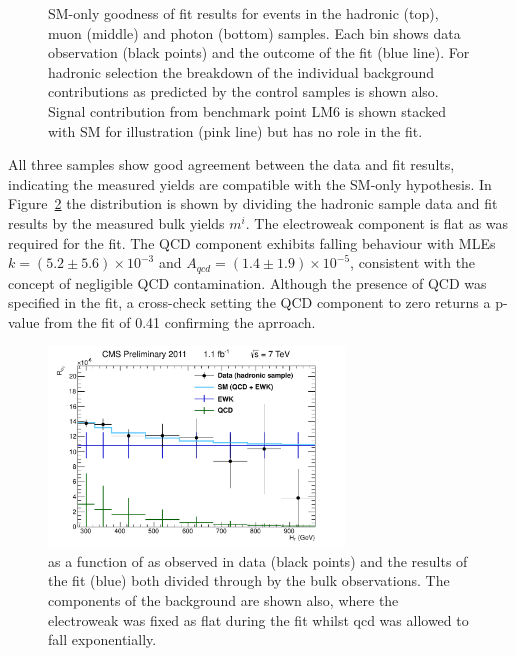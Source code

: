 \begin{figure}[htbp]
\begin{center}
     \caption{\label{fig:fit} SM-only goodness of fit results for events in the hadronic (top), muon (middle) and photon (bottom) samples. Each \scalht bin shows data observation (black points) and the outcome of the fit (blue line). For hadronic selection the breakdown of the individual background contributions as predicted by the control samples is shown also. Signal contribution from benchmark point LM6 is shown stacked with SM for illustration (pink line) but has no role in the fit.}
   \end{center}
 \end{figure}
 
 All three samples show good agreement between the data and fit results, indicating the measured yields are compatible with the SM-only hypothesis. In Figure~\ref{fig:fitrat} the \RaT distribution is shown by dividing the hadronic sample data and fit results by the measured bulk yields $m^{i}$. The electroweak component is flat as was required for the fit. The QCD component exhibits falling behaviour with MLEs $k = (5.2 \pm 5.6) \times 10^{-3}$ and $A_{qcd} = (1.4 \pm 1.9) \times 10^{-5}$, consistent with the concept of negligible QCD contamination. Although the presence of QCD was specified in the fit, a cross-check setting the QCD component to zero returns a p-value from the fit of 0.41 confirming the aprroach. 
 
 \begin{figure}[htbp]
   \begin{center}
      \includegraphics[width = 0.70\textwidth]{Figures/Analysis/PAS/stats_plots/RQcdFallingExp/hadronic_signal_alphaT_ratio.pdf}
     \caption{\label{fig:fitrat} \RaT as a function of \scalht as observed in data (black points) and the results of the fit (blue) both divided through by the bulk observations. The components of the background are shown also, where the electroweak was fixed as flat during the fit whilst qcd was allowed to fall exponentially. }
   \end{center}
 \end{figure}
 
